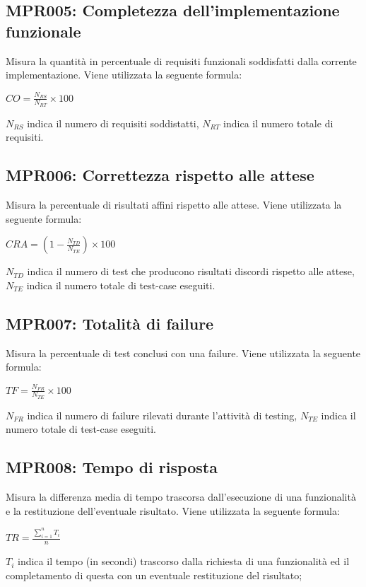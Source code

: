 \subsection{MPR005: Completezza dell'implementazione funzionale}
Misura la quantità in percentuale di requisiti funzionali soddisfatti dalla corrente implementazione. Viene utilizzata la seguente formula: 
\begin{center}{$CO=\frac{N_{RS}}{N_{RT}}\times 100$}\end{center}
$N_{RS}$  indica il numero di requisiti soddistatti, $N_{RT}$  indica il numero totale di requisiti.

\subsection{MPR006: Correttezza  rispetto alle attese}
Misura la percentuale di risultati affini rispetto alle attese. Viene utilizzata la seguente formula:
\begin{center}{$CRA=(1-\frac{N_{TD}}{N_{TE}})\times 100$}\end{center}
${N_{TD}}$ indica il numero di test che producono risultati discordi rispetto alle attese, ${N_{TE}}$ indica il numero totale di test-case eseguiti.

\subsection{MPR007: Totalità di failure}
Misura la percentuale di test conclusi con una failure. Viene utilizzata la seguente formula:
\begin{center}{$TF=\frac{N_{FR}}{N_{TE}}\times 100$}\end{center}
${N_{FR}}$ indica il numero di failure rilevati durante l'attività di testing,
${N_{TE}}$ indica il numero totale di test-case eseguiti.

\subsection{MPR008: Tempo di risposta}
Misura la differenza media di tempo trascorsa dall’esecuzione di una funzionalità e la restituzione
dell’eventuale risultato. Viene utilizzata la seguente formula:
\begin{center}{$TR=\frac{\sum\limits_{i=1}^n {T_i }}{n}$}\end{center}
${T_i}$ indica il tempo (in secondi) trascorso dalla richiesta di una funzionalità ed il completamento di questa con un eventuale restituzione del risultato;\\

